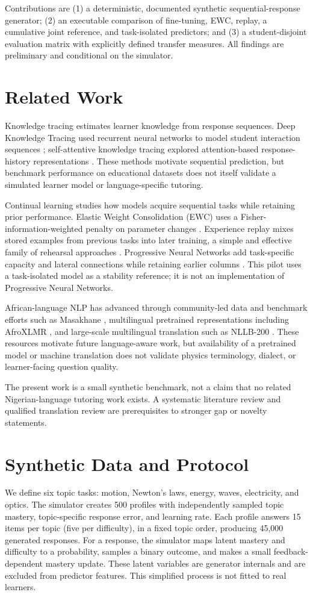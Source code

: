 \documentclass[conference]{IEEEtran}
\begin{document}
Contributions are (1) a deterministic, documented synthetic sequential-response generator; (2) an executable comparison of fine-tuning, EWC, replay, a cumulative joint reference, and task-isolated predictors; and (3) a student-disjoint evaluation matrix with explicitly defined transfer measures. All findings are preliminary and conditional on the simulator.
\section{Related Work}
Knowledge tracing estimates learner knowledge from response sequences. Deep Knowledge Tracing used recurrent neural networks to model student interaction sequences \cite{piech2015}; self-attentive knowledge tracing explored attention-based response-history representations \cite{pandey2019}. These methods motivate sequential prediction, but benchmark performance on educational datasets does not itself validate a simulated learner model or language-specific tutoring.

Continual learning studies how models acquire sequential tasks while retaining prior performance. Elastic Weight Consolidation (EWC) uses a Fisher-information-weighted penalty on parameter changes \cite{kirkpatrick2017}. Experience replay mixes stored examples from previous tasks into later training, a simple and effective family of rehearsal approaches \cite{robins1995}. Progressive Neural Networks add task-specific capacity and lateral connections while retaining earlier columns \cite{rusu2016}. This pilot uses a task-isolated model as a stability reference; it is not an implementation of Progressive Neural Networks.

African-language NLP has advanced through community-led data and benchmark efforts such as Masakhane \cite{nekoto2020}, multilingual pretrained representations including AfroXLMR \cite{alabi2022}, and large-scale multilingual translation such as NLLB-200 \cite{nllb2022}. These resources motivate future language-aware work, but availability of a pretrained model or machine translation does not validate physics terminology, dialect, or learner-facing question quality.

The present work is a small synthetic benchmark, not a claim that no related Nigerian-language tutoring work exists. A systematic literature review and qualified translation review are prerequisites to stronger gap or novelty statements.
\section{Synthetic Data and Protocol}
We define six topic tasks: motion, Newton's laws, energy, waves, electricity, and optics. The simulator creates 500 profiles with independently sampled topic mastery, topic-specific response error, and learning rate. Each profile answers 15 items per topic (five per difficulty), in a fixed topic order, producing 45,000 generated responses. For a response, the simulator maps latent mastery and difficulty to a probability, samples a binary outcome, and makes a small feedback-dependent mastery update. These latent variables are generator internals and are excluded from predictor features. This simplified process is not fitted to real learners.
\end{document}
